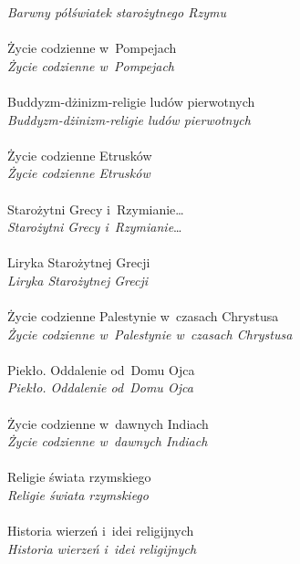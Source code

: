 \documentclass[a4paper,11pt]{article}
\numberwithin{equation}{section}
\begin{document}
\PowinnoByc \textit{Barwny półświatek starożytnego Rzymu} \\
 \\
\Jest Życie codzienne w~Pompejach \\
\PowinnoByc \textit{Życie codzienne w~Pompejach} \\
 \\
\Jest Buddyzm-dżinizm-religie ludów pierwotnych \\
\PowinnoByc \textit{Buddyzm-dżinizm-religie ludów pierwotnych} \\
 \\
\Jest Życie codzienne Etrusków \\
\PowinnoByc \textit{Życie codzienne Etrusków} \\
 \\
\Jest Starożytni Grecy i~Rzymianie\ldots \\
\PowinnoByc \textit{Starożytni Grecy i~Rzymianie}\ldots \\
 \\
\Jest Liryka Starożytnej Grecji \\
\PowinnoByc \textit{Liryka Starożytnej Grecji} \\
 \\
\Jest Życie codzienne Palestynie w~czasach Chrystusa \\
\PowinnoByc \textit{Życie codzienne w~Palestynie w~czasach Chrystusa} \\
 \\
\Jest Piekło. Oddalenie od~Domu Ojca \\
\PowinnoByc \textit{Piekło. Oddalenie od~Domu Ojca} \\
 \\
\Jest Życie codzienne w~dawnych Indiach \\
\PowinnoByc \textit{Życie codzienne w~dawnych Indiach} \\
 \\
\Jest Religie świata rzymskiego \\
\PowinnoByc \textit{Religie świata rzymskiego} \\
 \\
\Jest Historia wierzeń i~idei religijnych \\
\PowinnoByc \textit{Historia wierzeń i~idei religijnych} \\
 \\
\end{document}
